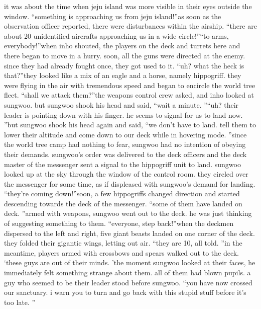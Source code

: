 it was about the time when jeju island was more visible in their eyes outside the window.
“something is approaching us from jeju island!”as soon as the observation officer reported, there were disturbances within the airship.
“there are about 20 unidentified aircrafts approaching us in a wide circle!”“to arms, everybody!”when inho shouted, the players on the deck and turrets here and there began to move in a hurry.
soon, all the guns were directed at the enemy.
 since they had already fought once, they got used to it.
“uh? what the heck is that?”they looked like a mix of an eagle and a horse, namely hippogriff.
 they were flying in the air with tremendous speed and began to encircle the world tree fleet.
“shall we attack them?”the weapons control crew asked, and inho looked at sungwoo.
but sungwoo shook his head and said, “wait a minute.
”“uh? their leader is pointing down with his finger.
 he seems to signal for us to land now.
”but sungwoo shook his head again and said, “we don’t have to land.
 tell them to lower their altitude and come down to our deck while in hovering mode.
”since the world tree camp had nothing to fear, sungwoo had no intention of obeying their demands.
 sungwoo’s order was delivered to the deck officers and the deck master of the messenger sent a signal to the hippogriff unit to land.
sungwoo looked up at the sky through the window of the control room.
 they circled over the messenger for some time, as if displeased with sungwoo’s demand for landing.
“they’re coming down!”soon, a few hippogriffs changed direction and started descending towards the deck of the messenger.
“some of them have landed on deck.
”armed with weapons, sungwoo went out to the deck.
 he was just thinking of suggesting something to them.
“everyone, step back!”when the deckmen dispersed to the left and right, five giant beasts landed on one corner of the deck.
 they folded their gigantic wings, letting out air.
“they are 10, all told.
”in the meantime, players armed with crossbows and spears walked out to the deck.
‘these guys are out of their minds.
’the moment sungwoo looked at their faces, he immediately felt something strange about them.
 all of them had blown pupils.
a guy who seemed to be their leader stood before sungwoo.
“you have now crossed our sanctuary.
 i warn you to turn and go back with this stupid stuff before it’s too late.
”

